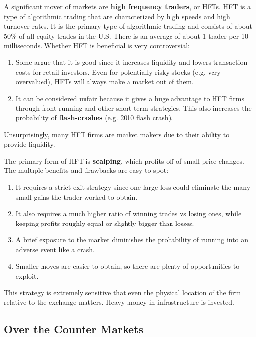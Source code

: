 \documentclass{article}
\begin{document}
      A significant mover of markets are \textbf{high frequency traders}, or HFTs. HFT is a type of algorithmic trading that are characterized by high speeds and high turnover rates. It is the primary type of algorithmic trading and consists of about 50\% of all equity trades in the U.S. There is an average of about 1 trader per 10 milliseconds. Whether HFT is beneficial is very controversial: 
      \begin{enumerate}
          \item Some argue that it is good since it increases liquidity and lowers transaction costs for retail investors. Even for potentially risky stocks (e.g. very overvalued), HFTs will always make a market out of them. 
          \item It can be considered unfair because it gives a huge advantage to HFT firms through front-running and other short-term strategies. This also increases the probability of \textbf{flash-crashes} (e.g. 2010 flash crash). 
      \end{enumerate}
      Unsurprisingly, many HFT firms are market makers due to their ability to provide liquidity. 

      The primary form of HFT is \textbf{scalping}, which profits off of small price changes. The multiple benefits and drawbacks are easy to spot: 
      \begin{enumerate}
          \item It requires a strict exit strategy since one large loss could eliminate the many small gains the trader worked to obtain. 
          \item It also requires a much higher ratio of winning trades vs losing ones, while keeping profits roughly equal or slightly bigger than losses. 
          \item A brief exposure to the market diminishes the probability of running into an adverse event like a crash. 
          \item Smaller moves are easier to obtain, so there are plenty of opportunities to exploit. 
      \end{enumerate}
      This strategy is extremely sensitive that even the physical location of the firm relative to the exchange matters. Heavy money in infrastructure is invested. 

  \subsection{Over the Counter Markets}
\end{document}
